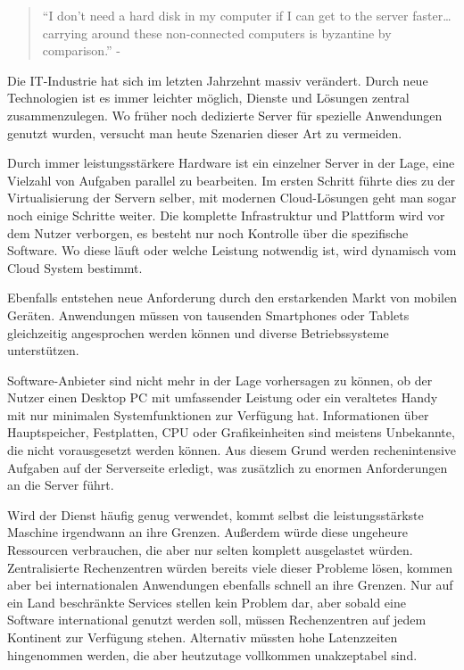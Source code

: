 \begin{quotation}
	``I don’t need a hard disk in my computer if I can get to the server faster… carrying around these non-connected computers is byzantine by comparison.'' - \parencite{jobs.1997}
\end{quotation}

Die IT-Industrie hat sich im letzten Jahrzehnt massiv verändert. Durch neue Technologien ist es immer leichter möglich, Dienste und Lösungen zentral zusammenzulegen. Wo früher noch dedizierte Server für spezielle Anwendungen genutzt wurden, versucht man heute Szenarien dieser Art zu vermeiden.

Durch immer leistungsstärkere Hardware ist ein einzelner Server in der Lage, eine Vielzahl von Aufgaben parallel zu bearbeiten. Im ersten Schritt führte dies zu der Virtualisierung der Servern selber, mit modernen Cloud-Lösungen geht man sogar noch einige Schritte weiter. Die komplette Infrastruktur und Plattform wird vor dem Nutzer verborgen, es besteht nur noch Kontrolle über die spezifische Software. Wo diese läuft oder welche Leistung notwendig ist, wird dynamisch vom Cloud System bestimmt.

Ebenfalls entstehen neue Anforderung durch den erstarkenden Markt von mobilen Geräten. Anwendungen müssen von tausenden Smartphones oder Tablets gleichzeitig angesprochen werden können und diverse Betriebssysteme unterstützen. 

Software-Anbieter sind nicht mehr in der Lage vorhersagen zu können, ob der Nutzer einen Desktop PC mit umfassender Leistung oder ein veraltetes Handy mit nur minimalen Systemfunktionen zur Verfügung hat. Informationen über Hauptspeicher, Festplatten, CPU oder Grafikeinheiten sind meistens Unbekannte, die nicht vorausgesetzt werden können. Aus diesem Grund werden rechenintensive Aufgaben auf der Serverseite erledigt, was zusätzlich zu enormen Anforderungen an die Server führt.

Wird der Dienst häufig genug verwendet, kommt selbst die leistungsstärkste Maschine irgendwann an ihre Grenzen. Außerdem würde diese ungeheure Ressourcen verbrauchen, die aber nur selten komplett ausgelastet würden. 
Zentralisierte Rechenzentren würden bereits viele dieser Probleme lösen, kommen aber bei internationalen Anwendungen ebenfalls schnell an ihre Grenzen. Nur auf ein Land beschränkte Services stellen kein Problem dar, aber sobald eine Software international genutzt werden soll, müssen Rechenzentren auf jedem Kontinent zur Verfügung stehen. Alternativ müssten hohe Latenzzeiten hingenommen werden, die aber heutzutage vollkommen unakzeptabel sind.

